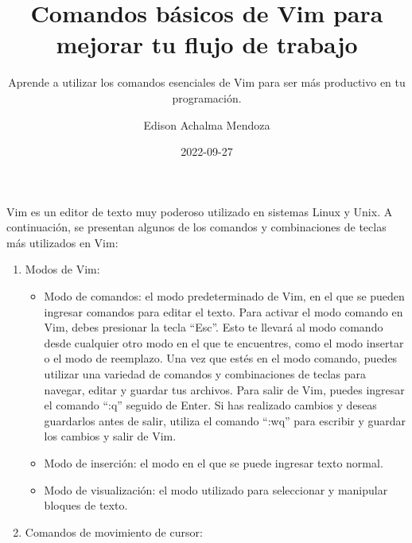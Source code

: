 \documentclass[
  letterpaper,
  DIV=11,
  numbers=noendperiod]{scrartcl}
\title{Comandos básicos de Vim para mejorar tu flujo de trabajo}
\subtitle{Aprende a utilizar los comandos esenciales de Vim para ser más
productivo en tu programación.}
\author{Edison Achalma Mendoza}
\date{2022-09-27}
\begin{document}
\maketitle
\ifdefined\Shaded\renewenvironment{Shaded}{\begin{tcolorbox}[sharp corners, borderline west={3pt}{0pt}{shadecolor}, boxrule=0pt, frame hidden, interior hidden, breakable, enhanced]}{\end{tcolorbox}}\fi

Vim es un editor de texto muy poderoso utilizado en sistemas Linux y
Unix. A continuación, se presentan algunos de los comandos y
combinaciones de teclas más utilizados en Vim:

\begin{enumerate}
\def\labelenumi{\arabic{enumi}.}
\item
  Modos de Vim:

  \begin{itemize}
  \item
    Modo de comandos: el modo predeterminado de Vim, en el que se pueden
    ingresar comandos para editar el texto. Para activar el modo comando
    en Vim, debes presionar la tecla ``Esc''. Esto te llevará al modo
    comando desde cualquier otro modo en el que te encuentres, como el
    modo insertar o el modo de reemplazo. Una vez que estés en el modo
    comando, puedes utilizar una variedad de comandos y combinaciones de
    teclas para navegar, editar y guardar tus archivos. Para salir de
    Vim, puedes ingresar el comando ``:q'' seguido de Enter. Si has
    realizado cambios y deseas guardarlos antes de salir, utiliza el
    comando ``:wq'' para escribir y guardar los cambios y salir de Vim.
  \item
    Modo de inserción: el modo en el que se puede ingresar texto normal.
  \item
    Modo de visualización: el modo utilizado para seleccionar y
    manipular bloques de texto.
  \end{itemize}
\item
  Comandos de movimiento de cursor:


\end{enumerate}
\end{document}
